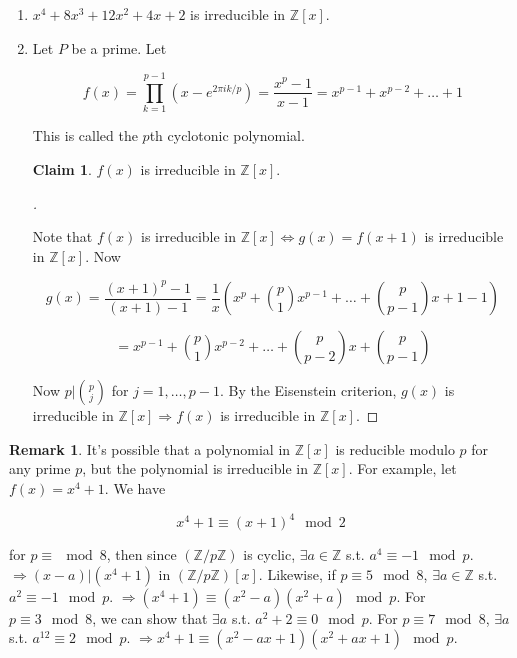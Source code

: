 \documentclass{article}
\theoremstyle{definition}
\newtheorem{rem}{Remark}
\newtheorem*{clm}{Claim}
\newenvironment{proofs}[1][\proofname]{%
  \begin{proof}[#1]$ $\par\nobreak\ignorespaces
}{%
  \end{proof}
}
\begin{document}
  \begin{ex}
	\begin{enumerate}
	  \item $x^4 + 8x^3 + 12x^2 + 4 x + 2$ is irreducible in $\mathbb{Z}[x]$. 
	  \item Let $P$ be a prime. Let 
  
		$$f(x) = \prod_{k = 1}^{p - 1} (x - e^{2 \pi i k/p}) = \frac{x^p - 1}{x - 1} = x^{p - 1} + x^{p - 2} + \hdots + 1$$
  
		This is called the $p$th cyclotonic polynomial. 
  
		\begin{clm}
		  $f(x)$ is irreducible in $\mathbb{Z}[x]$. 
		\end{clm}
		
		\begin{proofs}
		  Note that $f(x)$ is irreducible in $\mathbb{Z}[x] \Leftrightarrow g(x) = f(x + 1)$ is irreducible in $\mathbb{Z}[x]$. Now
  
		  $$g(x) = \frac{(x+1)^p - 1}{(x+1) - 1} = \frac{1}{x} (x^p + \binom{p}{1} x^{p - 1} + \hdots + \binom{p}{p - 1}x + 1  - 1)$$
  
		  $$ = x^{p - 1} + \binom{p}{1} x^{p - 2} + \hdots + \binom{p}{p - 2} x + \binom{p}{p - 1}$$
  
		  Now $p|\binom{p}{j}$ for $j = 1, \hdots, p - 1$. By the Eisenstein criterion, $g(x)$ is irreducible in $\mathbb{Z}[x] \Rightarrow f(x)$ is irreducible in $\mathbb{Z}[x]$. 
		\end{proofs}
	\end{enumerate}
  \end{ex}
  
  \begin{rem}
	It's possible that a polynomial in $\mathbb{Z}[x]$ is reducible modulo $p$ for any prime $p$, but the polynomial is irreducible in $\mathbb{Z}[x]$. For example, let $f(x) = x^4 + 1$. We have 
  
	$$x^4 + 1 \equiv (x+1)^4 \mod 2$$
  
	for $p \equiv \mod 8$, then since $(\mathbb{Z}/p\mathbb{Z})$ is cyclic, $\exists a \in \mathbb{Z}$ s.t. $a^4 \equiv -1 \mod p$. $\Rightarrow (x - a) | (x^4 + 1)$ in $(\mathbb{Z}/p\mathbb{Z})[x]$. Likewise, if $p \equiv 5 \mod 8$, $\exists a \in \mathbb{Z}$ s.t. $a^2 \equiv -1 \mod p$. $\Rightarrow (x^4 + 1) \equiv (x^2 - a)(x^2 + a) \mod p$. For $p \equiv 3 \mod 8$, we can show that $\exists a$ s.t. $a^2 + 2 \equiv 0 \mod p$. For $p \equiv 7 \mod 8$, $\exists a $ s.t. $a^{12} \equiv 2 \mod p$. $\Rightarrow x^4 + 1 \equiv (x^2 - ax + 1)(x^2 + ax + 1) \mod p$.
  \end{rem}
\end{document}
